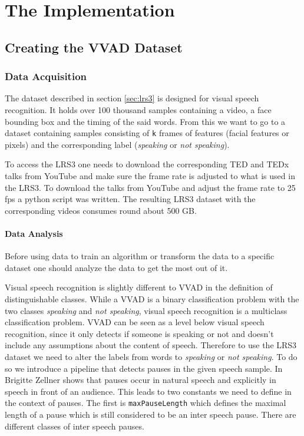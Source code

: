 \chapter{The Implementation}

\section{Creating the VVAD Dataset}\label{sec:createVVAD}

\subsection{Data Acquisition}\label{ssec:dataAcquisition}
The dataset described in section \ref{sec:lrs3} is designed for visual speech recognition. It holds over 100 thousand samples containing a video, a face bounding box and the timing of the said words.
From this we want to go to a dataset containing samples consisting of \texttt{k} frames of features (facial features or pixels) and the corresponding label (\emph{speaking} or \emph{not speaking}).

To access the LRS3 one needs to download the corresponding TED and TEDx talks from YouTube and make sure the frame rate is adjusted to what is used in the LRS3. To download the talks from YouTube and adjust the frame rate to 25 fps a python script was written. The resulting LRS3 dataset with the corresponding videos consumes round about 500 GB.

\subsubsection{Data Analysis}\label{ssec:dataAnalysis} 
Before using data to train an algorithm or transform the data to a specific dataset one should analyze the data to get the most out of it.

Visual speech recognition is slightly different to VVAD in the definition of distinguishable classes.
While a VVAD is a binary classification problem with the two classes \emph{speaking} and \emph{not speaking}, visual speech recognition is a multiclass classification problem.
VVAD can be seen as a level below visual speech recognition, since it only detects if someone is speaking or not and doesn't include any assumptions about the content of speech.
Therefore to use the LRS3 dataset we need to alter the labels from words to \emph{speaking} or \emph{not speaking}.
To do so we introduce a pipeline that detects pauses in the given speech sample.
In \cite{BrigPaus1994} Brigitte Zellner
shows that pauses occur in natural speech and explicitly in speech in front of an audience.
This leads to two constants we need to define in the context of pauses.
The first is \texttt{maxPauseLength} which defines the maximal length of a pause which is still considered to be an inter speech pause.
There are different classes of inter speech pauses.

